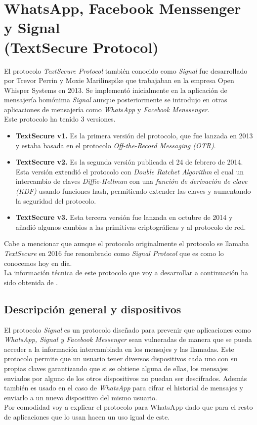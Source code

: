 \section{WhatsApp, Facebook Menssenger y Signal\\ (TextSecure Protocol)}
El protocolo \emph{TextSecure Protocol} también conocido como \emph{Signal} fue desarrollado por Trevor Perrin y Moxie Marilinspike que trabajaban en la empresa Open Whisper Systems en 2013. Se implementó inicialmente en la aplicación de mensajería homónima \emph{Signal} aunque posteriormente se introdujo en otras aplicaciones de mensajería como \emph{WhatsApp} y \emph{Facebook Menssenger}.\\
Este protocolo ha tenido 3 versiones.
\begin{itemize}
	\item \textbf{TextSecure v1.} Es la primera versión del protocolo, que fue lanzada en 2013 y estaba basada en el protocolo \emph{Off-the-Record Messaging (OTR)}.
	\item \textbf{TextSecure v2.} Es la segunda versión publicada el 24 de febrero de 2014. Esta versión extendió el protocolo con \emph{Double Ratchet Algorithm} el cual un intercambio de claves \emph{Diffie-Hellman} con una \emph{función de derivación de clave (KDF)} usando funciones hash, permitiendo extender las claves y aumentando la seguridad del protocolo.
	\item \textbf{TextSecure v3.} Esta tercera versión fue lanzada en octubre de 2014 y añadió algunos cambios a las primitivas criptográficas y al protocolo de red.
\end{itemize}
Cabe a mencionar que aunque el protocolo originalmente el protocolo se llamaba \emph{TextSecure} en 2016 fue renombrado como \emph{Signal Protocol} que es como lo conocemos hoy en día.\\
La información técnica de este protocolo que voy a desarrollar a continuación ha sido obtenida de \cite{November2021b}.

\subsection{Descripción general y dispositivos}
El protocolo \emph{Signal} es un protocolo diseñado para prevenir que aplicaciones como \emph{WhatsApp, Signal y Facebook Messenger} sean vulneradas de manera que se pueda acceder a la información intercambiada en los mensajes y las llamadas. Este protocolo permite que un usuario tener diversos dispositivos cada uno con su propias claves garantizando que si se obtiene alguna de ellas, los mensajes enviados por alguno de los otros dispositivos no puedan ser descifrados. Además también es usado en el caso de \emph{WhatsApp} para cifrar el historial de mensajes y enviarlo a un nuevo dispositivo del mismo usuario.\\
Por comodidad voy a explicar el protocolo para WhatsApp dado que para el resto de aplicaciones que lo usan hacen un uso igual de este.\\

